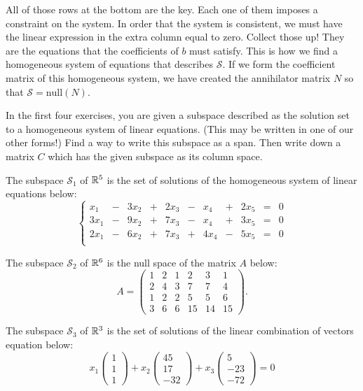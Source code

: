 \documentclass[elementsmain.tex]{subfiles}
\begin{document}
All of those rows at the bottom are the key. Each one of them imposes a constraint on the system. In order that the system is consistent, we must have the linear expression in the extra column equal to zero. Collect those up! They are the equations that the coefficients of $b$ must satisfy. This is how we find a homogeneous system of equations that describes $\mathcal{S}$. If we form the coefficient matrix of this homogeneous system, we have created the annihilator matrix $N$ so that $\mathcal{S} = \mathrm{null}(N)$.



\clearpage

In the first four exercises, you are given a subspace described as the solution set to a homogeneous system of linear equations. (This may be written in one of our other forms!) Find a way to write this subspace as a span. Then write down a matrix $C$ which has the given subspace as its column space.

\begin{exercise} The subspace $\mathcal{S}_1$ of $\mathbb{R}^5$ is the set of solutions of the homogeneous system of linear equations below:
\[
\left\{\begin{array}{rrrrrrrrrrr}
x_1 & - & 3x_2 & + & 2x_3 & - & x_4 & + & 2x_5 & = & 0 \\ 
3x_1 & - & 9x_2 & + & 7x_3 & - & x_4 & + & 3x_5 & = & 0 \\
2x_1 & - & 6x_2 & + & 7x_3 & + & 4x_4 & - & 5x_5 & = & 0 \\
\end{array}\right.
\]
\end{exercise}

\begin{exercise} The subspace $\mathcal{S}_2$ of $\mathbb{R}^6$ is the null space of the matrix $A$ below:
\[
A = \begin{pmatrix}   
1 & 2 & 1 & 2 & 3 & 1 \\ 2 & 4 & 3 & 7 & 7 & 4 \\ 1 & 2 & 2 & 5 & 5 & 6 \\
3 & 6 & 6 & 15 & 14 & 15
\end{pmatrix}.
\]
\end{exercise}


\begin{exercise} The subspace $\mathcal{S}_3$ of $\mathbb{R}^3$ is the set of solutions of the linear combination of vectors equation below:
\[
x_1 \begin{pmatrix} 1 \\ 1 \\ 1 \end{pmatrix} + x_2 \begin{pmatrix} 45 \\ 17 \\ -32 \end{pmatrix} + x_3 \begin{pmatrix} 5 \\ -23 \\ -72  \end{pmatrix}  = 0
\]
\end{exercise}
\end{document}
